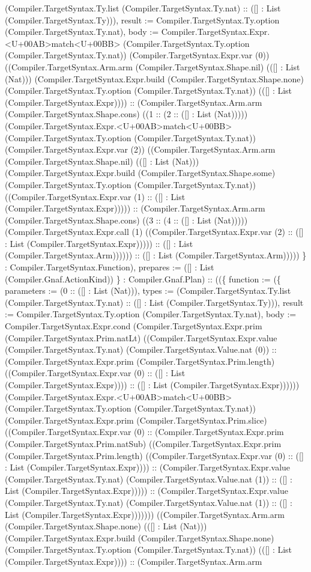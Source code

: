 \documentclass[11pt]{article}
\begin{document}
(Compiler.TargetSyntax.Ty.list (Compiler.TargetSyntax.Ty.nat) :: ([] : List (Compiler.TargetSyntax.Ty))), result := Compiler.TargetSyntax.Ty.option (Compiler.TargetSyntax.Ty.nat), body := Compiler.TargetSyntax.Expr.<U+00AB>match<U+00BB> (Compiler.TargetSyntax.Ty.option (Compiler.TargetSyntax.Ty.nat)) (Compiler.TargetSyntax.Expr.var (0)) ((Compiler.TargetSyntax.Arm.arm (Compiler.TargetSyntax.Shape.nil) (([] : List (Nat))) (Compiler.TargetSyntax.Expr.build (Compiler.TargetSyntax.Shape.none) (Compiler.TargetSyntax.Ty.option (Compiler.TargetSyntax.Ty.nat)) (([] : List (Compiler.TargetSyntax.Expr)))) :: (Compiler.TargetSyntax.Arm.arm (Compiler.TargetSyntax.Shape.cons) ((1 :: (2 :: ([] : List (Nat))))) (Compiler.TargetSyntax.Expr.<U+00AB>match<U+00BB> (Compiler.TargetSyntax.Ty.option (Compiler.TargetSyntax.Ty.nat)) (Compiler.TargetSyntax.Expr.var (2)) ((Compiler.TargetSyntax.Arm.arm (Compiler.TargetSyntax.Shape.nil) (([] : List (Nat))) (Compiler.TargetSyntax.Expr.build (Compiler.TargetSyntax.Shape.some) (Compiler.TargetSyntax.Ty.option (Compiler.TargetSyntax.Ty.nat)) ((Compiler.TargetSyntax.Expr.var (1) :: ([] : List (Compiler.TargetSyntax.Expr))))) :: (Compiler.TargetSyntax.Arm.arm (Compiler.TargetSyntax.Shape.cons) ((3 :: (4 :: ([] : List (Nat))))) (Compiler.TargetSyntax.Expr.call (1) ((Compiler.TargetSyntax.Expr.var (2) :: ([] : List (Compiler.TargetSyntax.Expr))))) :: ([] : List (Compiler.TargetSyntax.Arm)))))) :: ([] : List (Compiler.TargetSyntax.Arm))))) \} : Compiler.TargetSyntax.Function), prepares := ([] : List (Compiler.Gnaf.ActionKind)) \} : Compiler.Gnaf.Plan) :: ((\{ function := (\{ parameters := (0 :: ([] : List (Nat))), types := (Compiler.TargetSyntax.Ty.list (Compiler.TargetSyntax.Ty.nat) :: ([] : List (Compiler.TargetSyntax.Ty))), result := Compiler.TargetSyntax.Ty.option (Compiler.TargetSyntax.Ty.nat), body := Compiler.TargetSyntax.Expr.cond (Compiler.TargetSyntax.Expr.prim (Compiler.TargetSyntax.Prim.natLt) ((Compiler.TargetSyntax.Expr.value (Compiler.TargetSyntax.Ty.nat) (Compiler.TargetSyntax.Value.nat (0)) :: (Compiler.TargetSyntax.Expr.prim (Compiler.TargetSyntax.Prim.length) ((Compiler.TargetSyntax.Expr.var (0) :: ([] : List (Compiler.TargetSyntax.Expr)))) :: ([] : List (Compiler.TargetSyntax.Expr)))))) (Compiler.TargetSyntax.Expr.<U+00AB>match<U+00BB> (Compiler.TargetSyntax.Ty.option (Compiler.TargetSyntax.Ty.nat)) (Compiler.TargetSyntax.Expr.prim (Compiler.TargetSyntax.Prim.slice) ((Compiler.TargetSyntax.Expr.var (0) :: (Compiler.TargetSyntax.Expr.prim (Compiler.TargetSyntax.Prim.natSub) ((Compiler.TargetSyntax.Expr.prim (Compiler.TargetSyntax.Prim.length) ((Compiler.TargetSyntax.Expr.var (0) :: ([] : List (Compiler.TargetSyntax.Expr)))) :: (Compiler.TargetSyntax.Expr.value (Compiler.TargetSyntax.Ty.nat) (Compiler.TargetSyntax.Value.nat (1)) :: ([] : List (Compiler.TargetSyntax.Expr))))) :: (Compiler.TargetSyntax.Expr.value (Compiler.TargetSyntax.Ty.nat) (Compiler.TargetSyntax.Value.nat (1)) :: ([] : List (Compiler.TargetSyntax.Expr))))))) ((Compiler.TargetSyntax.Arm.arm (Compiler.TargetSyntax.Shape.none) (([] : List (Nat))) (Compiler.TargetSyntax.Expr.build (Compiler.TargetSyntax.Shape.none) (Compiler.TargetSyntax.Ty.option (Compiler.TargetSyntax.Ty.nat)) (([] : List (Compiler.TargetSyntax.Expr)))) :: (Compiler.TargetSyntax.Arm.arm 
\end{document}
